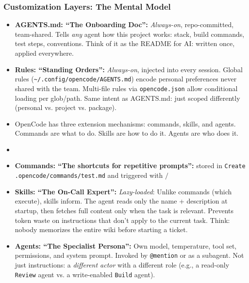 \begin{frame}[fragile]\frametitle{Customization Layers:  The Mental Model}
  \begin{itemize}

    \item \textbf{AGENTS.md:  ``The Onboarding Doc'':} \textit{Always-on}, repo-committed, team-shared. Tells \textit{any} agent how this project works: stack, build commands, test steps, conventions. Think of it as the README for AI:  written once, applied everywhere.
    \item \textbf{Rules:  ``Standing Orders'':} \textit{Always-on}, injected into every session. Global rules (\texttt{\textasciitilde/.config/opencode/AGENTS.md}) encode personal preferences never shared with the team. Multi-file rules via \texttt{opencode.json} allow conditional loading per glob/path. Same intent as AGENTS.md:  just scoped differently (personal vs. project vs. package).
	\item OpenCode has three extension mechanisms: commands, skills, and agents. Commands are what to do. Skills are how to do it. Agents are who does it. 
	\item \item \textbf{Commands:  ``The shortcuts for repetitive prompts'':} stored in \lstinline|Create .opencode/commands/test.md| and triggered with $/$
    \item \textbf{Skills:  ``The On-Call Expert'':} \textit{Lazy-loaded}: Unlike commands (which execute), skills inform. The agent reads only the name + description at startup, then fetches full content only when the task is relevant. Prevents token waste on instructions that don't apply to the current task. Think: nobody memorizes the entire wiki before starting a ticket.
    \item \textbf{Agents:  ``The Specialist Persona'':} Own model, temperature, tool set, permissions, and system prompt. Invoked by \texttt{@mention} or as a subagent. Not just instructions:  a \textit{different actor} with a different role (e.g., a read-only \texttt{Review} agent vs. a write-enabled \texttt{Build} agent).
  \end{itemize}
\end{frame}


